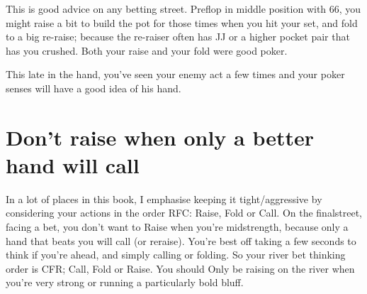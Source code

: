 This is good advice on any betting street. Preflop in middle
position with 66, you might raise a bit to build the pot for those
times when you hit your set, and fold to a big re-raise; because the
re-raiser often has JJ or a higher pocket pair that has you crushed.
Both your raise and your fold were good poker.



This late in the hand, you've seen your enemy act a few times and your
poker senses will have a good idea of his hand.

\section{Don't raise when only a better hand will call}

In a lot of places in this book, I emphasise keeping it
tight/aggressive by considering your actions in the order RFC: Raise,
Fold or Call. On the finalstreet, facing a bet, you don't want to
Raise when you're midstrength, because only a hand that beats you will
call (or reraise). You're best off taking a few seconds to think if
you're ahead, and simply calling or folding. So your river bet
thinking order is CFR; Call, Fold or Raise. You should Only be raising
on the river when you're very strong or running a particularly bold
bluff.
